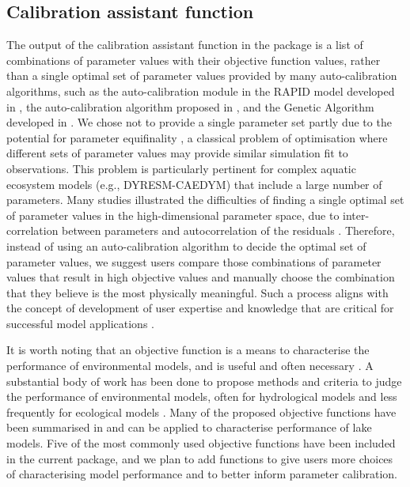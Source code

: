 \subsection{Calibration assistant function}

The output of the calibration assistant function in the  package is a list of combinations of parameter values with their objective function values, rather than a single optimal set of parameter values provided by many auto-calibration algorithms, such as the auto-calibration module in the RAPID model developed in \citet{david2011river}, the auto-calibration algorithm proposed in \citet{luo2018autocalibration}, and the Genetic Algorithm developed in \citet{goldberg1988genetic}. We chose not to provide a single parameter set partly due to the potential for parameter equifinality \citep{beven1992future}, a classical problem of optimisation where different sets of parameter values may provide similar simulation fit to observations. This problem is particularly pertinent for complex aquatic ecosystem models (e.g., DYRESM-CAEDYM) that include a large number of parameters. Many studies illustrated the difficulties of finding a single optimal set of parameter values in the high-dimensional parameter space, due to inter-correlation between parameters and autocorrelation of the residuals \citep{fernandez2010optimal,gupta2006model}. Therefore, instead of using an auto-calibration algorithm to decide the optimal set of parameter values, we suggest users compare those combinations of parameter values that result in high objective values and manually choose the combination that they believe is the most physically meaningful. Such a process aligns with the concept of development of user expertise and knowledge that are critical for successful model applications \citep{hipsey2015predicting}.\par

It is worth noting that an objective function is a means to characterise the performance of environmental models, and is useful and often necessary \citep{bennett2013characterising}. A substantial body of work has been done to propose methods and criteria to judge the performance of environmental models, often for hydrological models \citep{jakeman2006ten,krause2005comparison} and less frequently for ecological models \citep{risbey1996assessing}. Many of the proposed objective functions have been summarised in \citet{bennett2013characterising} and can be applied to characterise performance of lake models. Five of the most commonly used objective functions have been included in the current package, and we plan to add functions to give users more choices of characterising model performance and to better inform parameter calibration.\par


